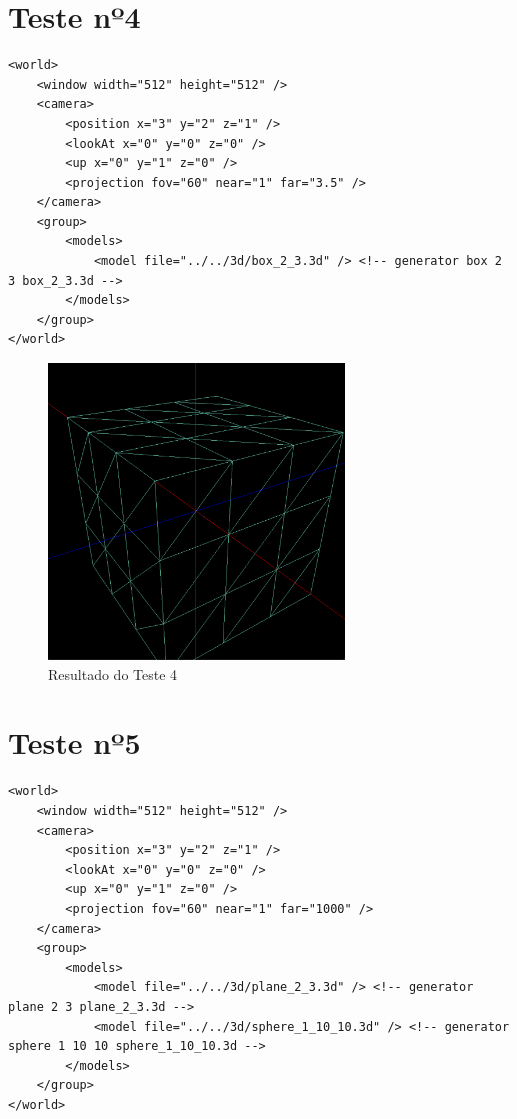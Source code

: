 \documentclass[11pt,a4paper]{report}%
\begin{document}
\section{Teste nº4}
\begin{lstlisting}[caption={XML do Teste 4}, label={teste4}]
<world> 
    <window width="512" height="512" />
    <camera> 
        <position x="3" y="2" z="1" />
        <lookAt x="0" y="0" z="0" />
        <up x="0" y="1" z="0" />
        <projection fov="60" near="1" far="3.5" /> 
    </camera>
    <group> 
        <models> 
            <model file="../../3d/box_2_3.3d" /> <!-- generator box 2 3 box_2_3.3d -->
        </models>
    </group>
</world>
\end{lstlisting}

\begin{figure}[H]
	\centering
	\includegraphics[width=0.7\textwidth]{images/box.png}
	\caption{Resultado do Teste 4} \label{fig:box}
\end{figure}

\section{Teste nº5}
\begin{lstlisting}[caption={XML do Teste 5}, label={teste5}]
<world> 
    <window width="512" height="512" />
    <camera> 
        <position x="3" y="2" z="1" />
        <lookAt x="0" y="0" z="0" />
        <up x="0" y="1" z="0" />
        <projection fov="60" near="1" far="1000" /> 
    </camera>
    <group> 
        <models> 
            <model file="../../3d/plane_2_3.3d" /> <!-- generator plane 2 3 plane_2_3.3d -->
            <model file="../../3d/sphere_1_10_10.3d" /> <!-- generator sphere 1 10 10 sphere_1_10_10.3d -->
        </models>
    </group>
</world>
\end{lstlisting}
\end{document}
